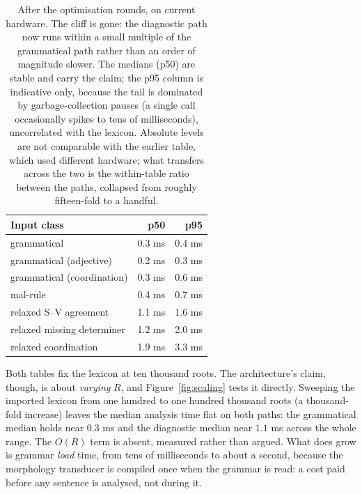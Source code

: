 \documentclass[11pt]{article}
\theoremstyle{definition}
\theoremstyle{plain}
\theoremstyle{remark}
\begin{document}
\begin{table}[H]
\centering
\begin{tabular}{@{}lrr@{}}
\toprule
Input class & p50 & p95 \\
\midrule
grammatical                 & 0.3 ms & 0.4 ms \\
grammatical (adjective)     & 0.2 ms & 0.3 ms \\
grammatical (coordination)  & 0.3 ms & 0.6 ms \\
mal-rule                    & 0.4 ms & 0.7 ms \\
relaxed S--V agreement      & 1.1 ms & 1.6 ms \\
relaxed missing determiner  & 1.2 ms & 2.0 ms \\
relaxed coordination        & 1.9 ms & 3.3 ms \\
\bottomrule
\end{tabular}
\caption{After the optimisation rounds, on current hardware. The cliff is gone:
the diagnostic path now runs within a small multiple of the grammatical path
rather than an order of magnitude slower. The medians (p50) are stable and carry
the claim; the p95 column is indicative only, because the tail is dominated by
garbage-collection pauses (a single call occasionally spikes to tens of
milliseconds), uncorrelated with the lexicon. Absolute levels are not comparable
with the earlier table, which used different hardware; what transfers across the
two is the within-table ratio between the paths, collapsed from roughly
fifteen-fold to a handful.}
\end{table}

Both tables fix the lexicon at ten thousand roots. The architecture's claim,
though, is about \emph{varying} $R$, and Figure~\ref{fig:scaling} tests it
directly. Sweeping the imported lexicon from one hundred to one hundred thousand
roots (a thousand-fold increase) leaves the median analysis time flat on both
paths: the grammatical median holds near \(0.3\) ms and the diagnostic median near
\(1.1\) ms across the whole range. The $O(R)$ term is absent, measured rather than
argued. What does grow is grammar \emph{load} time, from tens of milliseconds to
about a second, because the morphology transducer is compiled once when the grammar
is read: a cost paid before any sentence is analysed, not during it.
\end{document}
